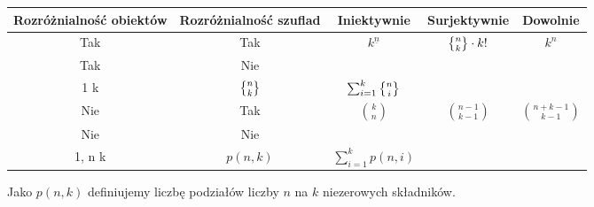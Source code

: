 \begin{table}[h]
	\centering
	\begin{tabular}{@{}cc|ccc@{}}
		\toprule
		Rozróżnialność obiektów & Rozróżnialność szuflad & Iniektywnie                                             & Surjektywnie                 & Dowolnie                         \\ \midrule
		Tak                     & Tak                    & \(k^{\underline{n}}\)                                   & \(\stirling{n}{k} \cdot k!\) & \(k^n\)                          \\
		Tak                     & Nie                    & \(\tiny \begin{cases} 0, n>k \\ 1 \leq k\end{cases}\)   & \(\stirling{n}{k}\)          & \(\sum_{i=1}^k \stirling{n}{i}\) \\
		Nie                     & Tak                    & \(\binom{k}{n} \)                                       & \(\binom{n-1}{k-1}\)         & \(\binom{n+k-1}{k-1}\)           \\
		Nie                     & Nie                    & \(\tiny\begin{cases}0, n>k \\ 1, n \leq k \end{cases}\) & \(p(n,k)\)                   & \(\sum_{i=1}^k p(n,i)\)          \\ \bottomrule
	\end{tabular}
\end{table}

Jako \(p(n,k)\) definiujemy liczbę podziałów liczby \(n\) na \(k\) niezerowych składników.
